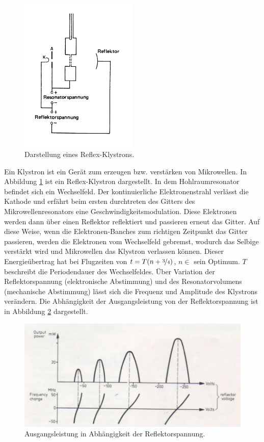 \begin{figure}
    \centering
    \includegraphics[width=0.5\textwidth]{Bilder/reflex_klystron.PNG}
    \caption{Darstellung eines Reflex-Klystrons.}
    \label{fig:klystron}
\end{figure}

Ein Klystron ist ein Gerät zum erzeugen bzw. verstärken von Mikrowellen. In Abbildung \ref{fig:klystron} ist ein Reflex-Klystron dargestellt. In dem Hohlraumresonator befindet sich ein Wechselfeld. Der kontinuierliche Elektronenstrahl verlässt die Kathode und erfährt beim ersten durchtreten des Gitters des Mikrowellenresonators eine Geschwindigkeitsmodulation. Diese Elektronen werden dann über einen Reflektor reflektiert und passieren erneut das Gitter. Auf diese Weise, wenn die Elektronen-Banches zum richtigen Zeitpunkt das Gitter passieren, werden die Elektronen vom Wechselfeld gebremst, wodurch das Selbige verstärkt wird und Mikrowellen das Klystron verlassen können. Dieser Energieübertrag hat bei Flugzeiten von $t = T(n+\nicefrac{3}{4})$, $n \in $ sein Optimum. $T$ beschreibt die Periodendauer des Wechselfeldes. Über Variation der Reflektorspannung (elektronische Abstimmung) und des Resonatorvolumens (mechanische Abstimmung)
lässt sich die Frequenz und Amplitude des Klystrons verändern. Die Abhängigkeit der Ausgangsleistung von der Reflektorspannung ist in Abbildung \ref{fig:reflektor} dargestellt.

\begin{figure}
    \centering
    \includegraphics[width=\textwidth]{Bilder/reflektor.PNG}
    \caption{Ausgangsleistung in Abhängigkeit der Reflektorspannung.}
    \label{fig:reflektor}
\end{figure}

